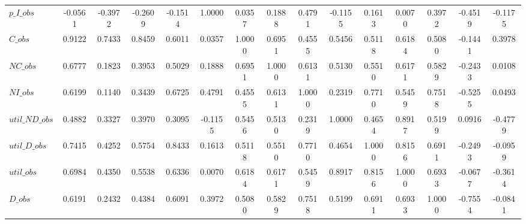 \begin{center}
\begin{longtable}{lcccccccccccccc}
$p\_I\_obs      $	 & 	          -0.0561	 & 	          -0.3972	 & 	          -0.2609	 & 	          -0.1514	 & 	           1.0000	 & 	           0.0357	 & 	           0.1888	 & 	           0.4791	 & 	          -0.1155	 & 	           0.1613	 & 	           0.0070	 & 	           0.3972	 & 	          -0.4519	 & 	          -0.1175 \\ 
$C\_obs         $	 & 	           0.9122	 & 	           0.7433	 & 	           0.8459	 & 	           0.6011	 & 	           0.0357	 & 	           1.0000	 & 	           0.6951	 & 	           0.4555	 & 	           0.5456	 & 	           0.5118	 & 	           0.6184	 & 	           0.5080	 & 	          -0.1441	 & 	           0.3978 \\ 
$NC\_obs        $	 & 	           0.6777	 & 	           0.1823	 & 	           0.3953	 & 	           0.5029	 & 	           0.1888	 & 	           0.6951	 & 	           1.0000	 & 	           0.6131	 & 	           0.5130	 & 	           0.5510	 & 	           0.6171	 & 	           0.5829	 & 	          -0.2433	 & 	           0.0108 \\ 
$NI\_obs        $	 & 	           0.6199	 & 	           0.1140	 & 	           0.3439	 & 	           0.6725	 & 	           0.4791	 & 	           0.4555	 & 	           0.6131	 & 	           1.0000	 & 	           0.2319	 & 	           0.7710	 & 	           0.5459	 & 	           0.7518	 & 	          -0.5255	 & 	           0.0493 \\ 
$util\_ND\_obs  $	 & 	           0.4882	 & 	           0.3327	 & 	           0.3970	 & 	           0.3095	 & 	          -0.1155	 & 	           0.5456	 & 	           0.5130	 & 	           0.2319	 & 	           1.0000	 & 	           0.4654	 & 	           0.8917	 & 	           0.5199	 & 	           0.0916	 & 	          -0.4779 \\ 
$util\_D\_obs   $	 & 	           0.7415	 & 	           0.4252	 & 	           0.5754	 & 	           0.8433	 & 	           0.1613	 & 	           0.5118	 & 	           0.5510	 & 	           0.7710	 & 	           0.4654	 & 	           1.0000	 & 	           0.8156	 & 	           0.6911	 & 	          -0.2493	 & 	          -0.0959 \\ 
$util\_obs      $	 & 	           0.6984	 & 	           0.4350	 & 	           0.5538	 & 	           0.6336	 & 	           0.0070	 & 	           0.6184	 & 	           0.6171	 & 	           0.5459	 & 	           0.8917	 & 	           0.8156	 & 	           1.0000	 & 	           0.6933	 & 	          -0.0677	 & 	          -0.3614 \\ 
$D\_obs         $	 & 	           0.6191	 & 	           0.2432	 & 	           0.4384	 & 	           0.6091	 & 	           0.3972	 & 	           0.5080	 & 	           0.5829	 & 	           0.7518	 & 	           0.5199	 & 	           0.6911	 & 	           0.6933	 & 	           1.0000	 & 	          -0.7554	 & 	          -0.0841 \\ 

\end{longtable}
\end{center}

